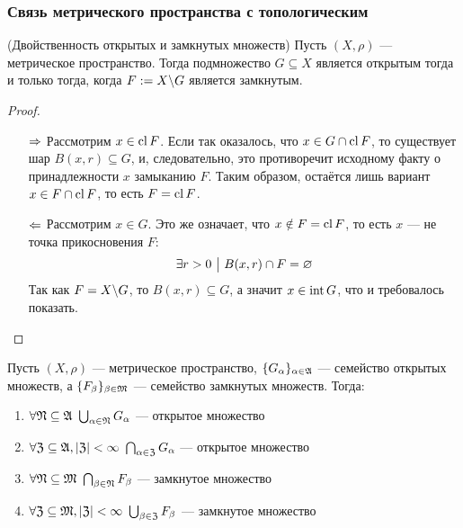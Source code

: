 \subsubsection*{Связь метрического пространства с топологическим}

\begin{theorem} (Двойственность открытых и замкнутых множеств)
	Пусть $(X, \rho)$ --- метрическое пространство. Тогда подмножество $G \subseteq X$ является открытым тогда и только тогда, когда $F := X \backslash G$ является замкнутым.
\end{theorem}

\begin{proof}~
	\begin{itemize}
		\item[$\Rightarrow$] Рассмотрим $x \in \operatorname{cl} F$. Если так оказалось, что $x \in G \cap \operatorname{cl} F$, то существует шар $B(x, r) \subseteq G$, и, следовательно, это противоречит исходному факту о принадлежности $x$ замыканию $F$. Таким образом, остаётся лишь вариант $x \in F \cap \operatorname{cl} F$, то есть $F = \operatorname{cl} F$.
		
		\item[$\Leftarrow$] Рассмотрим $x \in G$. Это же означает, что $x \notin F = \operatorname{cl} F$, то есть $x$ --- не точка прикосновения $F$:
		\[
			\exists r > 0 \ \big|\  B(x, r) \cap F = \varnothing
		\]
		Так как $F = X \backslash G$, то $B(x, r) \subseteq G$, а значит $x \in \operatorname{int} G$, что и требовалось показать.
	\end{itemize}
\end{proof}

\begin{theorem}
	Пусть $(X, \rho)$ --- метрическое пространство, $\{G_\alpha\}_{\alpha \in \mathfrak{A}}$ --- семейство открытых множеств, а $\{F_\beta\}_{\beta \in \mathfrak{M}}$ --- семейство замкнутых множеств. Тогда:
	\begin{enumerate}
		\item $\forall \gN \subseteq \gA\ \bigcup_{\alpha \in \gN} G_\alpha$ --- открытое множество
		
		\item $\forall \mathfrak{Z} \subseteq \mathfrak{A}, |\mathfrak{Z}| < \infty\ \bigcap_{\alpha \in \mathfrak{Z}} G_\alpha$ --- открытое множество
		
		\item $\forall \gN \subseteq \gM\ \bigcap_{\beta \in \gN} F_\beta$ --- замкнутое множество
		
		\item $\forall \mathfrak{Z} \subseteq \mathfrak{M}, |\mathfrak{Z}| < \infty\ \bigcup_{\beta \in \mathfrak{Z}} F_\beta$ --- замкнутое множество
	\end{enumerate}
\end{theorem}


